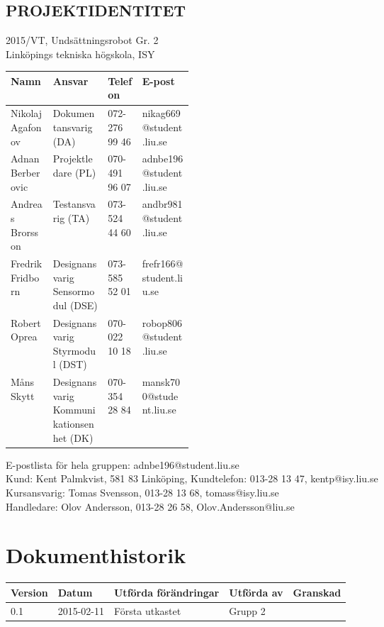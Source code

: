 \documentclass[11pt]{article}
\begin{document}
\pagebreak
\begin{center}

\section*{PROJEKTIDENTITET}
2015/VT, Undsättningsrobot Gr. 2
\\
Linköpings tekniska högskola, ISY
\\[0.5in]
\begin{table}[h]
\begin{tabular}{|l|p{0.3\linewidth}|l|l|} \hline
Namn & Ansvar & Telefon & E-post \\[0.1in] \hline
Nikolaj Agafonov & Dokumentansvarig (DA) & 072-276 99 46 & nikag669@student.liu.se \\ \hline
Adnan Berberovic & Projektledare (PL) & 070-491 96 07 & adnbe196@student.liu.se \\ \hline
Andreas Brorsson & Testansvarig (TA) & 073-524 44 60 & andbr981@student.liu.se \\ \hline
Fredrik Fridborn & Designansvarig Sensormodul (DSE) & 073-585 52 01 & frefr166@student.liu.se \\ \hline
Robert Oprea & Designansvarig Styrmodul (DST) & 070-022 10 18 & robop806@student.liu.se \\ \hline
Måns Skytt & Designansvarig Kommunikationsenhet (DK) & 070-354 28 84 & mansk700@student.liu.se \\ \hline
\end{tabular}
\end{table}

E-postlista för hela gruppen: adnbe196@student.liu.se
\\[1in]
Kund: Kent Palmkvist, 581 83 Linköping,
Kundtelefon: 013-28 13 47, kentp@isy.liu.se
\\[1in]
Kursansvarig: Tomas Svensson, 013-28 13 68, tomass@isy.liu.se
\\
Handledare: Olov Andersson, 013-28 26 58, Olov.Andersson@liu.se
\end{center}
\pagebreak

\tableofcontents

\pagebreak

\section*{Dokumenthistorik}
\begin{table}[h]
\begin{tabular}{|l|l|l|l|l|} \hline

Version & 
Datum & 
Utförda förändringar & 
Utförda av & 
Granskad \\[0.1in] \hline
0.1 &
2015-02-11 & 
Första utkastet & 
Grupp 2 & 
\\ \hline

\end{tabular}
\end{table}
\end{document}
